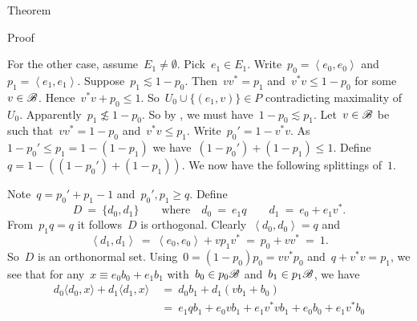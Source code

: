 \begin{parsec}
\begin{point}{Theorem}
\begin{point}{Proof}
\begin{point}
For the other case, assume~$E_1 \neq \emptyset$.
Pick~$e_1 \in E_1$.
Write~$p_0 = \left<e_0,e_0\right>$
    and~$p_1 = \left<e_1,e_1\right>$.
Suppose~$p_1 \lesssim 1 - p_0$.
Then~$vv^* = p_1$ and~$v^*v \leq 1- p_0$ for some~$v \in \mathscr{B}$.
    Hence~$v^*v + p_0 \leq 1$.
    So~$U_0 \cup \{ (e_1, v) \} \in P$ contradicting maximality of~$U_0$.
Apparently~$p_1 \not\lesssim 1-p_0$.
So by , we must have~$1-p_0 \lesssim p_1$.
Let~$v \in \mathscr{B}$ be such that~$vv^*=1-p_0$
    and~$v^*v \leq p_1$.
Write~$p_0' = 1- v^*v$.
As~$1-p_0' \leq p_1 =1-(1-p_1)$
we have~$(1-p_0') + (1-p_1) \leq 1$.
Define~$q = 1- ((1-p_0') + (1-p_1))$.
We now have the following splittings of~$1$.
\begin{center}
\end{center}
Note~$q = p_0'+p_1 - 1$ and~$p_0', p_1 \geq q$.
Define
\begin{equation*}
    D \ = \ \{d_0, d_1\} \qquad \text{where} \quad
    d_0 \ =\   e_1 q \qquad
    d_1 \ = \ e_0 + e_1v^*.
\end{equation*}
From~$p_1q=q$ it follows~$D$ is orthogonal.
Clearly~$\left<d_0,d_0\right>=q$ and
\begin{equation*}
    \left<d_1, d_1\right>
        \ =\ \left<e_0, e_0\right> + vp_1v^*    
        \ =\ p_0 + vv^* \ =\ 1.
\end{equation*}
So~$D$ is an orthonormal set.
Using~$0 = (1-p_0)p_0 = vv^*p_0 $ and~$q+v^*v = p_1$, we see
that for any~$x \equiv e_0 b_0 + e_1 b_1$
with~$b_0 \in p_0\mathscr{B}$ and~$b_1 \in p_1 \mathscr{B}$, we have
\begin{align*}
    d_0 \langle d_0, x \rangle + d_1 \langle d_1 , x \rangle
    &\ = \ d_0 b_1 + d_1(vb_1 + b_0) \\
    &\ = \ e_1 q b_1 + e_0 vb_1 + e_1v^*vb_1 + e_0 b_0 + e_1v^* b_0 \\

\end{align*}
\end{point}
\end{point}
\end{point}
\end{parsec}
